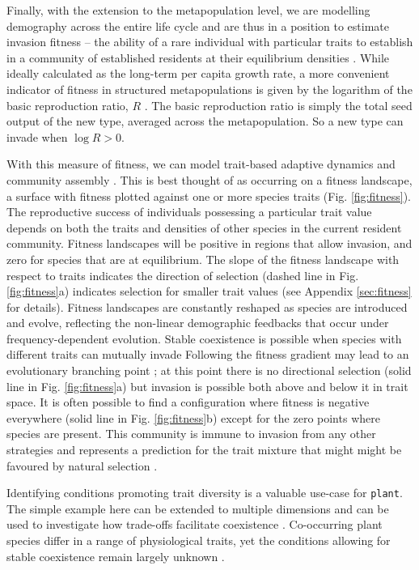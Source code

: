 \documentclass[a4paper,11pt]{article}
\newcommand{\plant}{\texttt{plant}}
\begin{document}
Finally, with the extension to the metapopulation level, we are
modelling demography across the entire life cycle and are thus in a
position to estimate invasion fitness -- the ability of a rare
individual with particular traits to establish in a community of
established residents at their equilibrium densities
\citep{Geritz-1998,Dieckmann-2007}.  While ideally calculated as the
long-term per capita growth rate, a more convenient indicator of
fitness in structured metapopulations is given by the
logarithm of the basic reproduction ratio, \(R\)
\citep{Gyllenberg-2001, Metz-2001}.
The basic reproduction ratio is simply the total seed output of 
the new type, averaged across the metapopulation. So a new type can 
invade when \(\log R > 0\).

With this measure of fitness, we can model trait-based adaptive
dynamics and community assembly \citep{Falster-2015}. This is best
thought of as occurring on a fitness landscape, a surface with fitness
plotted against one or more species traits
(Fig. \ref{fig:fitness}). The reproductive success of individuals
possessing a particular trait value depends on both the traits and
densities of other species in the current resident community. Fitness
landscapes will be positive in regions that allow invasion, and zero
for species that are at equilibrium. The slope of the fitness
landscape with respect to traits indicates the direction of selection
(dashed line in Fig. \ref{fig:fitness}a) indicates selection for
smaller trait values (see Appendix \ref{sec:fitness} for
details). Fitness landscapes are constantly reshaped as species are
introduced and evolve, reflecting the non-linear demographic feedbacks
that occur under frequency-dependent evolution. Stable coexistence is
possible when species with different traits can mutually invade
\citep{Geritz-1998} Following the fitness gradient may lead to an
evolutionary branching point \citep{Geritz-1998,Dieckmann-2007}; at
this point there is no directional selection (solid line in
Fig. \ref{fig:fitness}a) but invasion is possible both above and below
it in trait space. It is often possible to find a configuration where
fitness is negative everywhere (solid line in Fig. \ref{fig:fitness}b)
except for the zero points where species are present. This community
is immune to invasion from any other strategies and represents a
prediction for the trait mixture that might might be favoured by
natural selection \citep{Geritz-1998,Falster-2015}.

Identifying conditions promoting trait diversity is a valuable use-case
for {\plant}. The simple example here can be extended to multiple dimensions
and can be used to investigate how trade-offs facilitate coexistence
\citep{Falster-2015}. Co-occurring plant species differ in a range of physiological
traits, yet the conditions allowing for stable coexistence remain largely
unknown \citep{Adler-2013}. 
\end{document}
